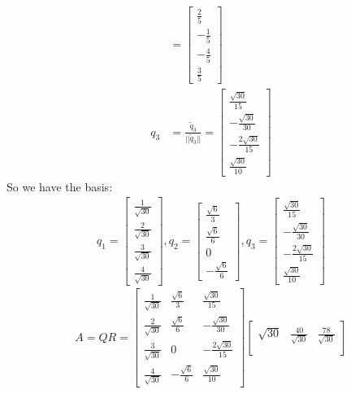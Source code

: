 \documentclass[english,onecolumn]{IEEEtran}
\begin{document}
\begin{enumerate}
\begin{align*}
    &=\begin{bmatrix}
    \frac{2}{5} \\
    -\frac{1}{5} \\
    -\frac{4}{5}\\
    \frac{3}{5}
    \end{bmatrix}\\
    q_3 &= \frac{\tilde{q}_3}{||\tilde{q}_3||}=\begin{bmatrix}
    \frac{\sqrt{30}}{15} \\
    -\frac{\sqrt{30}}{30} \\
    -\frac{2\sqrt{30}}{15}\\
    \frac{\sqrt{30}}{10}
    \end{bmatrix}
    \end{align*}
    So we have the basis:
	    \begin{align*}
    	q_1=\begin{bmatrix}
    \frac{1}{\sqrt{30}} \\
    \frac{2}{\sqrt{30}} \\
    \frac{3}{\sqrt{30}}\\
    \frac{4}{\sqrt{30}}
    \end{bmatrix},q_2=\begin{bmatrix}
    \frac{\sqrt{6}}{3} \\
    \frac{\sqrt{6}}{6} \\
    0\\
    -\frac{\sqrt{6}}{6}
    \end{bmatrix},q_3= \begin{bmatrix}
    \frac{\sqrt{30}}{15} \\
    -\frac{\sqrt{30}}{30} \\
    -\frac{2\sqrt{30}}{15}\\
    \frac{\sqrt{30}}{10}
    \end{bmatrix}
    \end{align*}
    $$A = QR = \begin{bmatrix}
    \frac{1}{\sqrt{30}} &  \frac{\sqrt{6}}{3} & \frac{\sqrt{30}}{15}\\
    \frac{2}{\sqrt{30}} &  \frac{\sqrt{6}}{6} & -\frac{\sqrt{30}}{30}\\
    \frac{3}{\sqrt{30}} &  0 & -\frac{2\sqrt{30}}{15}\\
    \frac{4}{\sqrt{30}} &  -\frac{\sqrt{6}}{6} & \frac{\sqrt{30}}{10} 
    \end{bmatrix}\begin{bmatrix}
    \sqrt{30} &  \frac{40}{\sqrt{30}} & \frac{78}{\sqrt{30}}\\

\end{bmatrix}$$
\end{enumerate}
\end{document}
